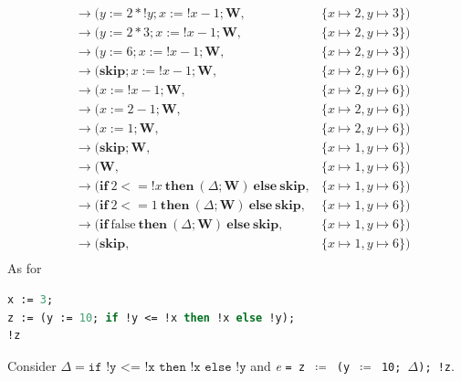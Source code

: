 \[\begin{aligned}
&\to (y := 2 * !y; x := !x - 1; \mathbf{W}, &\{x \mapsto 2, y \mapsto 3\}) \\
&\to (y := 2 * 3; x := !x - 1; \mathbf{W}, &\{x \mapsto 2, y \mapsto 3\}) \\
&\to (y := 6; x := !x - 1; \mathbf{W}, &\{x \mapsto 2, y \mapsto 3\}) \\
&\to (\mathbf{skip}; x := !x - 1; \mathbf{W}, &\{x \mapsto 2, y \mapsto 6\}) \\
&\to (x := !x - 1; \mathbf{W}, &\{x \mapsto 2, y \mapsto 6\}) \\
&\to (x := 2 - 1; \mathbf{W}, &\{x \mapsto 2, y \mapsto 6\}) \\
&\to (x := 1; \mathbf{W}, &\{x \mapsto 2, y \mapsto 6\}) \\
&\to (\mathbf{skip}; \mathbf{W}, &\{x \mapsto 1, y \mapsto 6\}) \\
&\to (\mathbf{W}, &\{x \mapsto 1, y \mapsto 6\}) \\
&\to (\mathbf{if}\ 2 < = !x\ \mathbf{then}\ (\Delta; \mathbf{W})\ \mathbf{else}\ \mathbf{skip}, &\{x \mapsto 1, y \mapsto 6\}) \\
&\to (\mathbf{if}\ 2 < = 1\ \mathbf{then}\ (\Delta; \mathbf{W})\ \mathbf{else}\ \mathbf{skip}, &\{x \mapsto 1, y \mapsto 6\}) \\
&\to (\mathbf{if}\ \text{false} \ \mathbf{then}\ (\Delta; \mathbf{W})\ \mathbf{else}\ \mathbf{skip}, &\{x \mapsto 1, y \mapsto 6\}) \\
&\to (\mathbf{skip}, &\{x \mapsto 1, y \mapsto 6\}) \\
\end{aligned}
\]
As for 
\begin{lstlisting}[language=OCaml]
x := 3;
z := (y := 10; if !y <= !x then !x else !y);
!z
\end{lstlisting}
Consider \(\Delta = \texttt{if !y <= !x then !x else !y}\) and \textit{e} \texttt{= z \(\coloneqq\) (y \(\coloneqq\) 10; \(\Delta\)); !z}.
